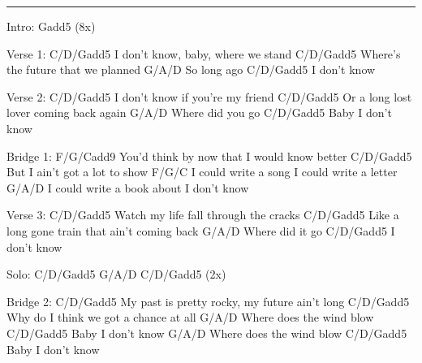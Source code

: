 \noindent\rule{\columnwidth}{1pt}

\begin{multicols}{2}
\begin{lstsong}
Intro: Gadd5 (8x)

Verse 1:
C/D/Gadd5
I don't know, baby, where we stand
C/D/Gadd5
Where's the future that we planned
         G/A/D
So long ago
        C/D/Gadd5
I don't know

Verse 2:
C/D/Gadd5
I don't know if you're my friend
C/D/Gadd5
Or a long lost lover coming back again
              G/A/D
Where did you go
             C/D/Gadd5
Baby I don't know

Bridge 1:
      F/G/Cadd9
You'd think by now that I would know better
C/D/Gadd5
But I ain't got a lot to show
F/G/C
I could write a song I could write a letter
G/A/D
I could write a book about I don't know





Verse 3:
C/D/Gadd5
Watch my life fall through the cracks
C/D/Gadd5
Like a long gone train that ain't coming back
             G/A/D
Where did it go
        C/D/Gadd5      
I don't know

Solo: C/D/Gadd5   G/A/D   C/D/Gadd5  (2x)

Bridge 2:
   C/D/Gadd5
My past is pretty rocky, my future ain't long
C/D/Gadd5
Why do I think we got a chance at all
               G/A/D
Where does the wind blow
             C/D/Gadd5
Baby I don't know
               G/A/D
Where does the wind blow
             C/D/Gadd5
Baby I don't know
\end{lstsong}
\end{multicols}
\newpage




